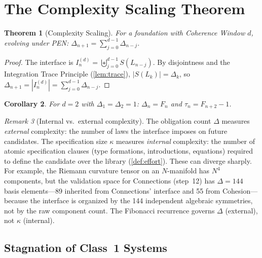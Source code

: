 \documentclass[11pt,a4paper]{article}
\theoremstyle{plain}
\newtheorem{theorem}{Theorem}[section]
\newtheorem{corollary}[theorem]{Corollary}
\theoremstyle{definition}
\theoremstyle{remark}
\newtheorem{remark}[theorem]{Remark}
\begin{document}
\section{The Complexity Scaling Theorem}
\label{sec:scaling}

\begin{theorem}[Complexity Scaling]
\label{thm:scaling}
For a foundation with Coherence Window $d$, evolving under PEN:
$\Delta_{n+1} = \sum_{j=0}^{d-1} \Delta_{n-j}$.
\end{theorem}

\begin{proof}
The interface is $I^{(d)}_n = \biguplus_{j=0}^{d-1} S(L_{n-j})$.
By disjointness and the Integration Trace Principle (\cref{lem:trace}), $|S(L_k)| = \Delta_k$, so
$\Delta_{n+1} = |I^{(d)}_n| = \sum_{j=0}^{d-1} \Delta_{n-j}$.
\end{proof}

\begin{corollary}
\label{cor:fibonacci}
For $d = 2$ with $\Delta_1 = \Delta_2 = 1$: $\Delta_n = F_n$ and $\tau_n = F_{n+2} - 1$.
\end{corollary}

\begin{remark}[Internal vs.\ external complexity]
\label{rem:int-ext-complexity}
The obligation count $\Delta$ measures \emph{external} complexity: the number of laws the interface imposes on future candidates.
The specification size $\kappa$ measures \emph{internal} complexity: the number of atomic specification clauses (type formations, introductions, equations) required to define the candidate over the library (\cref{def:effort}).
These can diverge sharply.
For example, the Riemann curvature tensor on an $N$-manifold has $N^4$ components, but the validation space for Connections (step~12) has $\Delta = 144$ basis elements---89 inherited from Connections' interface and 55 from Cohesion---because the interface is organized by the 144 independent algebraic symmetries, not by the raw component count.
The Fibonacci recurrence governs $\Delta$ (external), not $\kappa$ (internal).
\end{remark}

\subsection{Stagnation of Class~1 Systems}
\label{sec:stagnation}
\end{document}
